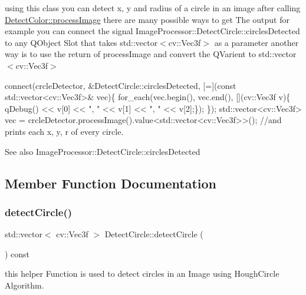 using this class you can detect x, y and radius of a circle in an image after calling \hyperlink{class_image_processor_1_1_detect_color_afb14622f8e1390f1cf887cc8bf1da568}{Detect\+Color\+::process\+Image} there are many possible ways to get The output for example you can connect the signal Image\+Processor\+::\+Detect\+Circle\+::circles\+Detected to any Q\+Object Slot that takes std\+::vector$<$cv\+::\+Vec3f$>$ as a parameter another way is to use the return of process\+Image and convert the Q\+Varient to std\+::vector$<$cv\+::\+Vec3f$>$ 
\begin{DoxyCode}
 connect(crcleDetector, &DetectCircle::circlesDetected, [=](\textcolor{keyword}{const} std::vector<cv::Vec3f>& vec)\{
     for\_each(vec.begin(), vec.end(), [](cv::Vec3f v)\{ qDebug() << v[0] << \textcolor{stringliteral}{", "} << v[1] << \textcolor{stringliteral}{", "} << v[2];\});
\});
 std::vector<cv::Vec3f> vec = crcleDetector.processImage().value<std::vector<cv::Vec3f>>(); \textcolor{comment}{//and prints
       each x, y, r of every circle.}
\end{DoxyCode}
 \begin{DoxySeeAlso}{See also}
Image\+Processor\+::\+Detect\+Circle\+::circles\+Detected 
\end{DoxySeeAlso}


\subsection{Member Function Documentation}
\mbox{\label{class_image_processor_1_1_detect_circle_a6324c8bfcc4e8df8d584a037250b22b2}} 
\subsubsection{\texorpdfstring{detect\+Circle()}{detectCircle()}}
{\footnotesize\ttfamily std\+::vector$<$ cv\+::\+Vec3f $>$ Detect\+Circle\+::detect\+Circle (\begin{DoxyParamCaption}{ }\end{DoxyParamCaption}) const}



this helper Function is used to detect circles in an Image using Hough\+Circle Algorithm. 

